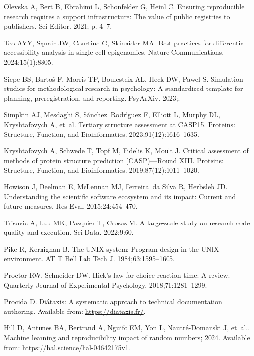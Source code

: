 \documentclass[11pt]{article}
\begin{document}
\begin{thebibliography}{10}
Olevska A, Bert B, Ebrahimi L, Schonfelder G, Heinl C.
\newblock Ensuring reproducible research requires a support infrastructure: The
  value of public registries to publishers.
\newblock Sci Editor. 2021; p. 4--7.

Teo AYY, Squair JW, Courtine G, Skinnider MA.
\newblock Best practices for differential accessibility analysis in single-cell
  epigenomics.
\newblock Nature Communications. 2024;15(1):8805.

Siepe BS, Bartoš F, Morris TP, Boulesteix AL, Heck DW, Pawel S.
\newblock Simulation studies for methodological research in psychology: A
  standardized template for planning, preregistration, and reporting.
\newblock PsyArXiv. 2023;.

Simpkin AJ, Mesdaghi S, S{\'a}nchez~Rodr{\'\i}guez F, Elliott L, Murphy DL,
  Kryshtafovych A, et~al.
\newblock Tertiary structure assessment at CASP15.
\newblock Proteins: Structure, Function, and Bioinformatics.
  2023;91(12):1616--1635.

Kryshtafovych A, Schwede T, Topf M, Fidelis K, Moult J.
\newblock Critical assessment of methods of protein structure prediction
  (CASP)—Round XIII.
\newblock Proteins: Structure, Function, and Bioinformatics.
  2019;87(12):1011--1020.

Howison J, Deelman E, McLennan MJ, Ferreira~da Silva R, Herbsleb JD.
\newblock Understanding the scientific software ecosystem and its impact:
  Current and future measures.
\newblock Res Eval. 2015;24:454--470.

Trisovic A, Lau MK, Pasquier T, Crosas M.
\newblock A large-scale study on research code quality and execution.
\newblock Sci Data. 2022;9:60.

Pike R, Kernighan B.
\newblock The {UNIX} system: Program design in the {UNIX} environment.
\newblock AT T Bell Lab Tech J. 1984;63:1595--1605.

Proctor RW, Schneider DW.
\newblock Hick’s law for choice reaction time: A review.
\newblock Quarterly Journal of Experimental Psychology. 2018;71:1281--1299.

Procida D. 
\newblock Diátaxis: A systematic approach to technical documentation authoring.
\newblock Available from: \url{https://diataxis.fr/}.

Hill D, Antunes BA, Bertrand A, Nguifo EM, Yon L, Nautré-Domanski J, et~al..
  Machine learning and reproducibility impact of random numbers; 2024.
\newblock Available from: \url{https://hal.science/hal-04642175v1}.


\end{thebibliography}
\end{document}
